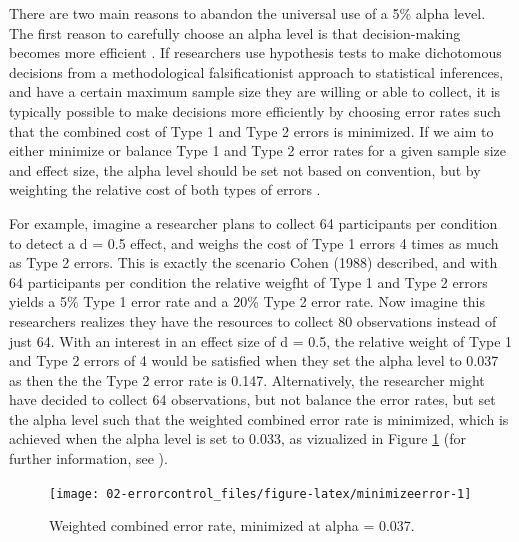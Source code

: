 \documentclass[
]{krantz}
\begin{document}
There are two main reasons to abandon the universal use of a 5\% alpha level. The first reason to carefully choose an alpha level is that decision-making becomes more efficient \citep{mudge_setting_2012}. If researchers use hypothesis tests to make dichotomous decisions from a methodological falsificationist approach to statistical inferences, and have a certain maximum sample size they are willing or able to collect, it is typically possible to make decisions more efficiently by choosing error rates such that the combined cost of Type 1 and Type 2 errors is minimized. If we aim to either minimize or balance Type 1 and Type 2 error rates for a given sample size and effect size, the alpha level should be set not based on convention, but by weighting the relative cost of both types of errors \citep{maier_justify_2022}.

For example, imagine a researcher plans to collect 64 participants per condition to detect a d = 0.5 effect, and weighs the cost of Type 1 errors 4 times as much as Type 2 errors. This is exactly the scenario Cohen (1988) described, and with 64 participants per condition the relative weigfht of Type 1 and Type 2 errors yields a 5\% Type 1 error rate and a 20\% Type 2 error rate. Now imagine this researchers realizes they have the resources to collect 80 observations instead of just 64. With an interest in an effect size of d = 0.5, the relative weight of Type 1 and Type 2 errors of 4 would be satisfied when they set the alpha level to 0.037 as then the the Type 2 error rate is 0.147. Alternatively, the researcher might have decided to collect 64 observations, but not balance the error rates, but set the alpha level such that the weighted combined error rate is minimized, which is achieved when the alpha level is set to 0.033, as vizualized in Figure \ref{fig:minimizeerror} (for further information, see \citet{maier_justify_2022}).

\begin{figure}

{\centering \texttt{[image: 02-errorcontrol\_files/figure-latex/minimizeerror-1]} 

}

\caption{Weighted combined error rate, minimized at alpha = 0.037.}\label{fig:minimizeerror}
\end{figure}
\end{document}
